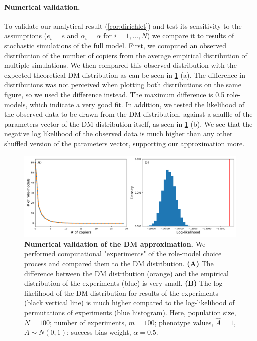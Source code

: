 \documentclass[12pt]{extarticle}
\begin{document}
\paragraph{Numerical validation.}
To validate our analytical result (\cref{cor:dirichlet}) and test its sensitivity to the assumptions ($e_i=e$ and $\alpha_i=\alpha$ for $i=1,\ldots,N$) we compare it to results of stochastic simulations of the full model.
First, we computed an observed distribution of the number of copiers from the average empirical distribution of multiple simulations.
We then compared this observed distribution with the expected theoretical DM distribution as can be seen in \cref{fig:DM_validation} (a). The difference in distributions was not perceived when plotting both distributions on the same figure, so we used the difference instead. The maximum difference is 0.5 role-models, which indicate a very good fit.
In addition, we tested the likelihood of the observed data to be drawn from the DM distribution, against a shuffle of the parameters vector of the DM distribution itself, as seen in \cref{fig:DM_validation} (b). We see that the negative log likelihood of the observed data is much higher than any other shuffled version of the parameters vector, supporting our approximation more.


\begin{figure}[h]
    \includegraphics[width=\linewidth]{../figures/final/DM_validation.pdf}
  \caption{
  \textbf{Numerical validation of the DM approximation.}
  We performed computational "experiments" of the role-model choice process and compared them to the DM distribution. 
  \textbf{(A)} The difference between the DM distribution (orange) and the empirical distribution of the experiments (blue) is very small. %
  \textbf{(B)} The log-likelihood of the DM distribution for results of the experiments (black vertical line) is much higher compared to the log-likelihood of permutations of experiments (blue histogram).
  Here, population size, $N=100$; number of experiments, $m=100$; phenotype values, $\hat{A}=1$, $A \sim N(0,1)$; success-bias weight, $\alpha=0.5$.}	
  \label{fig:DM_validation}
\end{figure}
\end{document}
